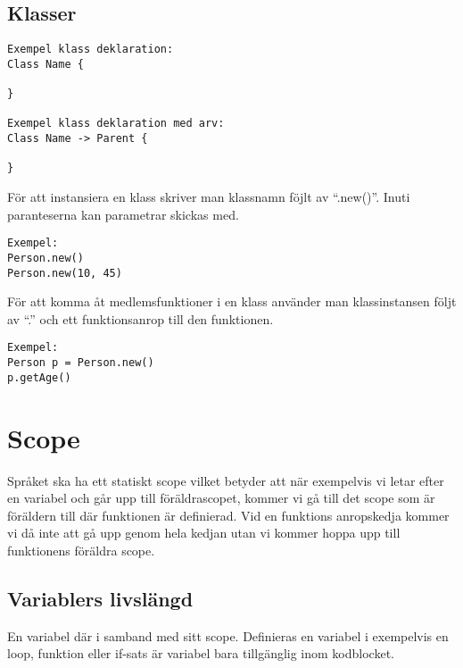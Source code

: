 \documentclass{TDP003mall}
\begin{document}
    \subsection{Klasser}
\begin{verbatim}
Exempel klass deklaration:
Class Name {
  
}

Exempel klass deklaration med arv:
Class Name -> Parent {
  
}

\end{verbatim}

För att instansiera en klass skriver man klassnamn föjlt av ``.new()''. Inuti paranteserna kan parametrar skickas med.

\begin{verbatim}
Exempel:
Person.new()
Person.new(10, 45)
\end{verbatim}

För att komma åt medlemsfunktioner i en klass använder man klassinstansen följt av ``.'' och ett funktionsanrop till den funktionen.

\begin{verbatim}
Exempel:
Person p = Person.new()
p.getAge()
\end{verbatim}

    \section{Scope}
    Språket ska ha ett statiskt scope vilket betyder att när exempelvis vi letar efter en variabel och går upp till föräldrascopet, kommer vi gå till det scope som är föräldern till där funktionen är definierad. Vid en funktions anropskedja kommer vi då inte att gå upp genom hela kedjan utan vi kommer hoppa upp till funktionens föräldra scope.

    \subsection{Variablers livslängd}
    En variabel där i samband med sitt scope. Definieras en variabel i exempelvis en loop, funktion eller if-sats är variabel bara tillgänglig inom kodblocket.
 
\end{document}
